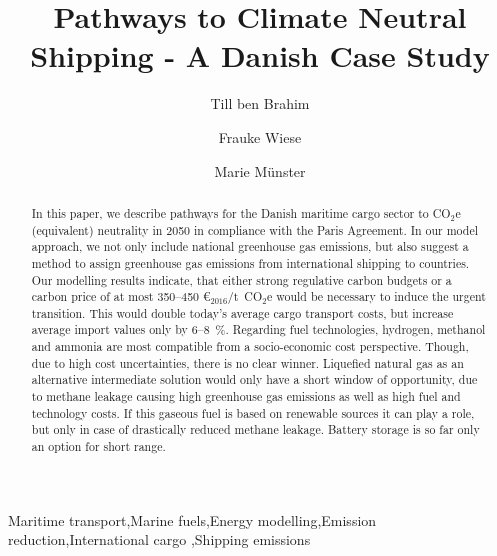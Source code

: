 \documentclass[article]{elsarticle}
\begin{document}
\begin{frontmatter}

\title{Pathways to Climate Neutral Shipping - A Danish Case Study}


\author[label1]{Till ben Brahim}
\address[label1]{Technical University of Denmark, Produktionstorvet 426, 2800 Kongens Lyngby, Denmark}


\author[label1]{Frauke Wiese}

\author[label1]{Marie M\"unster}

\begin{abstract}
In this paper, we describe pathways for the Danish maritime cargo sector to CO$_2$e (equivalent) neutrality in 2050 in compliance with the Paris Agreement. In our model approach, we not only include national greenhouse gas emissions, but also suggest a method to assign greenhouse gas emissions from international shipping to countries.
Our modelling results indicate, that either strong regulative carbon budgets or a carbon price of at most 350--450 \euro$_{2016}$/t~CO$_2$e would be necessary to induce the urgent transition. This would double today's average cargo transport costs, but increase average import values only by 6--8~\%.
Regarding fuel technologies, hydrogen, methanol and ammonia are most compatible from a socio-economic cost perspective. Though, due to high cost uncertainties, there is no clear winner.
Liquefied natural gas as an alternative intermediate solution would only have a short window of opportunity, due to methane leakage causing high greenhouse gas emissions as well as high fuel and technology costs. If this gaseous fuel is based on renewable sources it can play a role, but only in case of drastically reduced methane leakage. Battery storage is so far only an option for short range.
\end{abstract}

\begin{keyword}
Maritime transport\sep Marine fuels\sep Energy modelling\sep Emission reduction\sep International cargo \sep Shipping emissions
\end{keyword}

\end{frontmatter}
\end{document}
